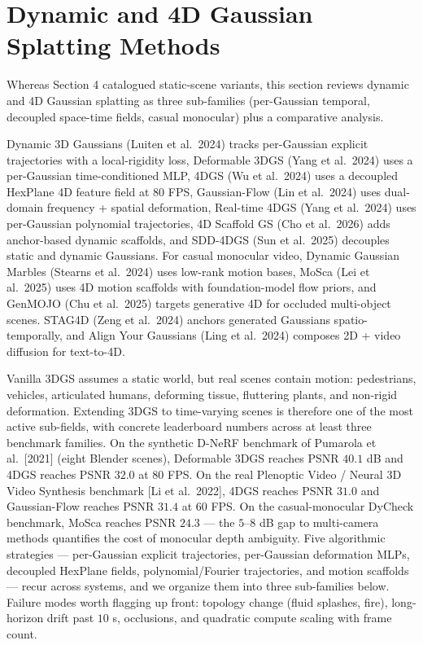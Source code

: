 \documentclass{article}
\begin{document}
\section{Dynamic and 4D Gaussian Splatting Methods}\label{dynamic-and-4d-gaussian-splatting-methods}

Whereas Section 4 catalogued static-scene variants, this section reviews dynamic and 4D Gaussian splatting as three sub-families (per-Gaussian temporal, decoupled space-time fields, casual monocular) plus a comparative analysis.

Dynamic 3D Gaussians (Luiten et al.~2024) tracks per-Gaussian explicit trajectories with a local-rigidity loss, Deformable 3DGS (Yang et al.~2024) uses a per-Gaussian time-conditioned MLP, 4DGS (Wu et al.~2024) uses a decoupled HexPlane 4D feature field at \(80\) FPS, Gaussian-Flow (Lin et al.~2024) uses dual-domain frequency + spatial deformation, Real-time 4DGS (Yang et al.~2024) uses per-Gaussian polynomial trajectories, 4D Scaffold GS (Cho et al.~2026) adds anchor-based dynamic scaffolds, and SDD-4DGS (Sun et al.~2025) decouples static and dynamic Gaussians. For casual monocular video, Dynamic Gaussian Marbles (Stearns et al.~2024) uses low-rank motion bases, MoSca (Lei et al.~2025) uses 4D motion scaffolds with foundation-model flow priors, and GenMOJO (Chu et al.~2025) targets generative 4D for occluded multi-object scenes. STAG4D (Zeng et al.~2024) anchors generated Gaussians spatio-temporally, and Align Your Gaussians (Ling et al.~2024) composes 2D + video diffusion for text-to-4D.

Vanilla 3DGS assumes a static world, but real scenes contain motion: pedestrians, vehicles, articulated humans, deforming tissue, fluttering plants, and non-rigid deformation. Extending 3DGS to time-varying scenes is therefore one of the most active sub-fields, with concrete leaderboard numbers across at least three benchmark families. On the synthetic D-NeRF benchmark of Pumarola et al.~{[}2021{]} (eight Blender scenes), Deformable 3DGS \cite{yang2024deformable3dgaussi} reaches PSNR \(40.1\) dB and 4DGS \cite{wu2024recentadvancesin3d} reaches PSNR \(32.0\) at \(80\) FPS. On the real Plenoptic Video / Neural 3D Video Synthesis benchmark {[}Li et al.~2022{]}, 4DGS reaches PSNR \(31.0\) and Gaussian-Flow \cite{lin2024gaussianflow4dreco} reaches PSNR \(31.4\) at \(60\) FPS. On the casual-monocular DyCheck benchmark, MoSca \cite{lei2025moscadynamicgaussi} reaches PSNR \(24.3\) --- the \(5\)--\(8\) dB gap to multi-camera methods quantifies the cost of monocular depth ambiguity. Five algorithmic strategies --- per-Gaussian explicit trajectories, per-Gaussian deformation MLPs, decoupled HexPlane fields, polynomial/Fourier trajectories, and motion scaffolds --- recur across systems, and we organize them into three sub-families below. Failure modes worth flagging up front: topology change (fluid splashes, fire), long-horizon drift past \(10\) s, occlusions, and quadratic compute scaling with frame count.
\end{document}
